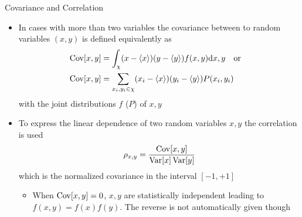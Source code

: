   \begin{frame}{Covariance and Correlation}
    \begin{itemize}
      \item In cases with more than two variables the covariance between to random variables $(x, y)$ is defined equivalently as
        \begin{align*}
          \operatorname{Cov}[x, y] &= \int_\chi (x-\langle x\rangle)(y-\langle y\rangle) f(x,y) \mathrm{d}x, y
          \quad\text{or}\quad \\
          \operatorname{Cov}[x, y] &= \sum_{x_i,y_i\in\chi}(x_i - \langle x\rangle)(y_i - \langle y\rangle) P(x_i, y_i)
        \end{align*}
        with the joint distributions $f$ ($P$) of $x, y$
      \item To express the linear dependence of two random variables $x, y$ the correlation is used
      \begin{equation*}
        \rho_{x,y} = \frac{\operatorname{Cov}[x, y]}{\operatorname{Var}[x]\operatorname{Var}[y]}
      \end{equation*}
      which is the normalized covariance in the interval $[-1, +1]$
      \begin{itemize}
        \item When $\operatorname{Cov}[x,y] = 0$, $x,y$ are statistically independent leading to $f(x,y) = f(x)f(y)$. The reverse is not automatically given though
      \end{itemize}
    \end{itemize}
  \end{frame}

